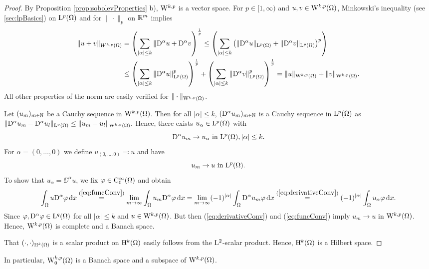 \begin{proof}
  By Proposition \ref{prop:sobolevProperties} b), $\mathrm{W}^{k,p}$ is a vector space.
  For $p \in [1,\infty)$ and $u,v \in \mathrm{W}^{k,p}(\Omega)$, Minkowski's inequality (see \ref{sec:lpBasics}) on $\mathrm{L}^p(\Omega)$ and for $\|\cdot\|_p$ on $\mathbb{R}^m$ implies
    \begin{align*}
      \|u + v\|_{W^{k,p}(\Omega)}
      &= \left( \sum_{|\alpha| \leq k} \|\mathrm{D}^\alpha u + \mathrm{D}^\alpha v \right)^{\frac{1}{p}} 
      \leq \left( \sum_{|\alpha|\leq k} \left( \|\mathrm{D}^\alpha u\|_{\mathrm{L}^p(\Omega)} + \|\mathrm{D}^\alpha v\|_{\mathrm{L}^p(\Omega)} \right)^p \right) \\
      &\leq \left( \sum_{|\alpha| \leq k} \|\mathrm{D}^\alpha u\|_{\mathrm{L}^p(\Omega)}^p\right)^{\frac{1}{p}}
      + \left( \sum_{|\alpha| \leq k} \|\mathrm{D}^\alpha v\|_{\mathrm{L}^p(\Omega)}^p\right)^{\frac{1}{p}}
      = \|u\|_{\mathrm{W}^{k,p}(\Omega)} + \|v\|_{\mathrm{W}^{k,p}(\Omega)}.
    \end{align*}
    All other properties of the norm are easily verified for $\|\cdot\|_{\mathrm{W}^{k,p}(\Omega)}$.

    Let $(u_m)_{m \in \mathbb{N}}$ be a Cauchy sequence in $\mathrm{W}^{k,p}(\Omega)$.
    Then for all $|\alpha|\leq k$, $(\mathrm{D}^\alpha u_m)_{m \in \mathbb{N}}$ is a Cauchy sequence in $\mathrm{L}^p(\Omega)$ as 
    $
    \|\mathrm{D}^\alpha u_m - \mathrm{D}^\alpha u_l \|_{\mathrm{L}^p(\Omega)} \leq \|u_m - u_l \|_{\mathrm{W}^{k,p}(\Omega)}.
    $
    Hence, there exists $u_\alpha \in \mathrm{L}^p(\Omega)$ with
    \begin{equation}
      \label{eq:derivativeConv}
      \mathrm{D}^\alpha u_m \to u_\alpha \text{ in } \mathrm{L}^p(\Omega), |\alpha| \leq k.
    \end{equation}
    For $\alpha = (0,\dots,0)$ we define $u_{(0,\dots,0)}  \eqqcolon u$ and have
    \begin{equation}
      \label{eq:funcConv}
      u_m \to u \text{ in } \mathrm{L}^p(\Omega).
    \end{equation}
    To show that $u_\alpha = \DD^\alpha u$, we fix $\varphi \in \mathrm{C}_0^\infty(\Omega)$ and obtain
    \begin{align*}
      \int_\Omega u \mathrm{D}^\alpha \varphi \, {\operatorname{d}\!{x}}
      \overset{(\ref{eq:funcConv})}{=} \lim_{m \to \infty} \int_\Omega u_m \mathrm{D}^\alpha \varphi \, {\operatorname{d}\!{x}} 
      = \lim_{m \to \infty} (-1)^{|\alpha|} \int_\Omega \mathrm{D}^\alpha u_m \varphi \, {\operatorname{d}\!{x}} 
      \overset{(\ref{eq:derivativeConv})}{=} (-1)^{|\alpha|} \int_\Omega u_\alpha \varphi \, {\operatorname{d}\!{x}}.
    \end{align*}
    Since $\varphi, \mathrm{D}^\alpha \varphi \in \mathrm{L}^q(\Omega)$ for all $|\alpha| \leq k$ and $u \in \mathrm{W}^{k,p}(\Omega)$.
    But then (\ref{eq:derivativeConv}) and (\ref{eq:funcConv}) imply $u_m \to u$ in $\mathrm{W}^{k,p}(\Omega)$.
    Hence, $\mathrm{W}^{k,p}(\Omega)$ is complete and a Banach space.

    That $(\cdot,\cdot)_{\mathrm{H}^k(\Omega)}$ is a scalar product on $\mathrm{H}^k(\Omega)$ easily follows from the $\mathrm{L}^2$-scalar product.
    Hence, $\mathrm{H}^k(\Omega)$ is a Hilbert space.
\end{proof}

In particular, $\mathrm{W}_0^{k,p}(\Omega)$ is a Banach space and a subspace of $\mathrm{W}^{k,p}(\Omega)$.
